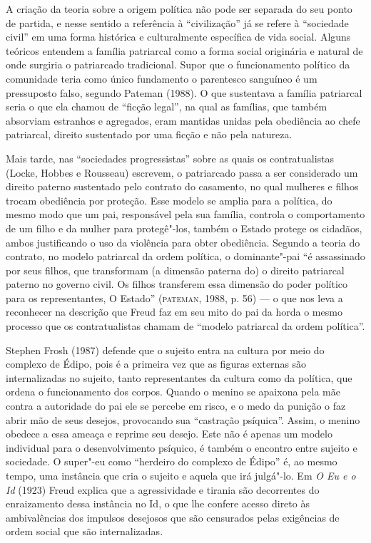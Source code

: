 A criação da teoria sobre a origem política não pode ser separada do seu
ponto de partida, e nesse sentido a referência à ``civilização'' já se
refere à ``sociedade civil'' em uma forma histórica e culturalmente
específica de vida social. Alguns teóricos entendem a família patriarcal
como a forma social originária e natural de onde surgiria o patriarcado
tradicional. Supor que o funcionamento político da comunidade teria como
único fundamento o parentesco sanguíneo é um pressuposto falso, segundo
Pateman (1988). O que sustentava a família patriarcal seria o que ela
chamou de ``ficção legal'', na qual as famílias, que também absorviam
estranhos e agregados, eram mantidas unidas pela obediência ao chefe
patriarcal, direito sustentado por uma ficção e não pela natureza.

Mais tarde, nas ``sociedades progressistas'' sobre as quais os
contratualistas (Locke, Hobbes e Rousseau) escrevem, o patriarcado passa
a ser considerado um direito paterno sustentado pelo contrato do
casamento, no qual mulheres e filhos trocam obediência por proteção.
Esse modelo se amplia para a política, do mesmo modo que um pai,
responsável pela sua família, controla o comportamento de um filho e da
mulher para protegê"-los, também o Estado protege os cidadãos, ambos
justificando o uso da violência para obter obediência. Segundo a teoria
do contrato, no modelo patriarcal da ordem política, o dominante"-pai ``é
assassinado por seus filhos, que transformam (a dimensão paterna do) o
direito patriarcal paterno no governo civil. Os filhos transferem essa
dimensão do poder político para os representantes, O Estado'' (\textsc{pateman},
1988, p. 56) --- o que nos leva a reconhecer na descrição que Freud faz
em seu mito do pai da horda o mesmo processo que os
contratualistas chamam de ``modelo patriarcal da ordem política''.

Stephen Frosh (1987) defende que o sujeito entra na cultura por meio do
complexo de Édipo, pois é a primeira vez que as figuras externas são
internalizadas no sujeito, tanto representantes da cultura como da
política, que ordena o funcionamento dos corpos. Quando o menino se
apaixona pela mãe contra a autoridade do pai ele se percebe em risco, e
o medo da punição o faz abrir mão de seus desejos, provocando sua
``castração psíquica''. Assim, o menino obedece a essa ameaça e reprime
seu desejo. Este não é apenas um modelo individual para o
desenvolvimento psíquico, é também o encontro entre sujeito e sociedade.
O super"-eu como ``herdeiro do complexo de Édipo'' é, ao mesmo tempo, uma
instância que cria o sujeito e aquela que irá julgá"-lo. Em \emph{O Eu e o Id}
(1923) Freud explica que a agressividade e tirania são decorrentes do
enraizamento dessa instância no Id, o que lhe confere acesso direto às
ambivalências dos impulsos desejosos que são censurados pelas exigências
de ordem social que são internalizadas.


